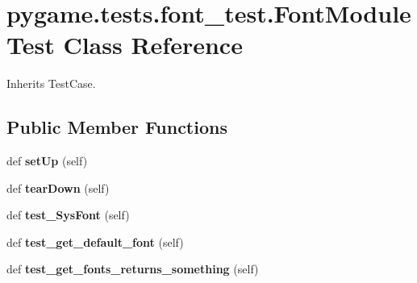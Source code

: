 \hypertarget{classpygame_1_1tests_1_1font__test_1_1_font_module_test}{}\section{pygame.\+tests.\+font\+\_\+test.\+Font\+Module\+Test Class Reference}
\label{classpygame_1_1tests_1_1font__test_1_1_font_module_test}


Inherits Test\+Case.

\subsection*{Public Member Functions}
\begin{DoxyCompactItemize}
\item 
\mbox{\label{classpygame_1_1tests_1_1font__test_1_1_font_module_test_aab38b68d3109ed3f2454e72252e2ce7a}} 
def {\bfseries set\+Up} (self)
\item 
\mbox{\label{classpygame_1_1tests_1_1font__test_1_1_font_module_test_a76fedd81de7359fa29609fa93ab1635c}} 
def {\bfseries tear\+Down} (self)
\item 
\mbox{\label{classpygame_1_1tests_1_1font__test_1_1_font_module_test_a091ee64312dfb5e5b6c7d7b06b89a0ec}} 
def {\bfseries test\+\_\+\+Sys\+Font} (self)
\item 
\mbox{\label{classpygame_1_1tests_1_1font__test_1_1_font_module_test_a6f34411c38073a2e3d8534bc4d2a71fc}} 
def {\bfseries test\+\_\+get\+\_\+default\+\_\+font} (self)
\item 
\mbox{\label{classpygame_1_1tests_1_1font__test_1_1_font_module_test_a47e7dff769785db60e1b2fa89267fce4}} 
def {\bfseries test\+\_\+get\+\_\+fonts\+\_\+returns\+\_\+something} (self)
\item 
\mbox{\label{classpygame_1_1tests_1_1font__test_1_1_font_module_test_a960ba54d2573789dc244db9d5a37529d}} 

\end{DoxyCompactItemize}

